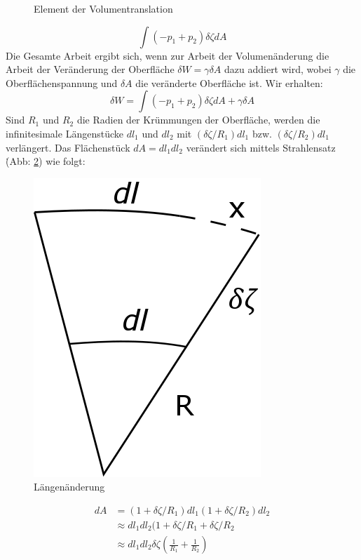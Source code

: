 \begin{refsection}
\begin{figure}
  \caption{Element der Volumentranslation} 
  \label{fig:Volumentransaltion}
\end{figure}
\begin{equation}
\int(-p_1+p_2)\delta \zeta dA
\end{equation}
Die Gesamte Arbeit ergibt sich, wenn zur Arbeit der Volumenänderung die Arbeit der Veränderung der Oberfläche $\delta W=\gamma \delta A $ dazu addiert wird, wobei $\gamma$ die Oberflächenspannung und $\delta A$ die veränderte Oberfläche ist. Wir erhalten:
\begin{equation}\label{YL-Arbeit_1}
\delta W=\int(-p_1+p_2)\delta\zeta dA + \gamma\delta A
\end{equation}
Sind $R_1$ und $R_2$ die Radien der Krümmungen der Oberfläche, werden die infinitesimale Längenstücke $dl_1$ und $dl_2$ mit $(\delta\zeta /R_1)dl_1$ bzw. $(\delta\zeta /R_2)dl_1$ verlängert. Das Flächenstück $dA=dl_1 dl_2$ verändert sich mittels Strahlensatz \.(Abb: \ref{fig:Strahlensatz}) wie folgt:
\begin{figure}
  \centering
  \includegraphics[scale=0.3]{minimal/Langenanderung.png}
  \caption{Längenänderung} 
  \label{fig:Strahlensatz}
\end{figure}
\begin{equation}
\begin{split}
dA &= (1+\delta\zeta/R_1)dl_1 (1+\delta\zeta/R_2)dl_2 \\
&\approx dl_1 dl_2 (1+\delta\zeta/R_1 + \delta\zeta/R_2 \\
&\approx dl_1 dl_2 \delta\zeta (\frac{1}{R_1}+\frac{1}{R_2})

\end{split}
\end{equation}
\end{refsection}
